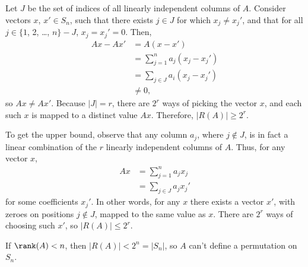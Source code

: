 Let $J$ be the set of indices of all linearly independent columns of $A$.
Consider vectors $x$, $x'\in S_n$, such that there exists $j\in J$ for which $x_j\ne x_j'$, and that for all $j\in\{1$, 2, \dots, $n\}-J$, $x_j=x_j'=0$.
Then,
\begin{align*}
    Ax-Ax' &= A(x-x') \\
    &= \sum_{j=1}^na_j(x_j-x_j') \\
    &= \sum_{j\in J}a_i(x_j-x_j') \\
    & \ne 0,
\end{align*}
so $Ax\ne Ax'$.
Because $|J|=r$, there are $2^r$ ways of picking the vector $x$, and each such $x$ is mapped to a distinct value $Ax$.
Therefore, $|R(A)|\ge2^r$.

To get the upper bound, observe that any column $a_j$, where $j\notin J$, is in fact a linear combination of the $r$ linearly independent columns of $A$.
Thus, for any vector $x$,
\begin{align*}
    Ax &= \sum_{j=1}^na_jx_j \\
    &= \sum_{j\in J}a_jx_j'
\end{align*}
for some coefficients $x_j'$.
In other words, for any $x$ there exists a vector $x'$, with zeroes on positions $j\notin J$, mapped to the same value as $x$.
There are $2^r$ ways of choosing such $x'$, so $|R(A)|\le2^r$.

If $\rank(A)<n$, then $|R(A)|<2^n=|S_n|$, so $A$ can't define a permutation on $S_n$.
